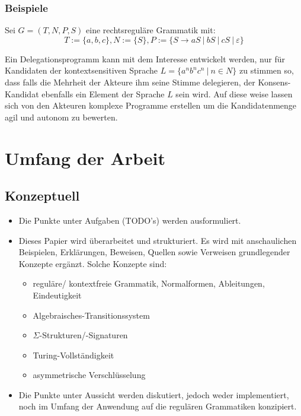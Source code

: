 \documentclass[]{article}
\begin{document}
\subsubsection*{Beispiele}

Sei $G=(T,N,P,S)$ eine rechtsreguläre Grammatik mit:
\[ T:=\{ a, b, c \}, N:=\{S\}, P:= \{S\rightarrow aS\ |\ bS\ |\ cS\ |\ \varepsilon \} \] 

Ein Delegationsprogramm kann mit dem Interesse entwickelt werden, nur für Kandidaten der kontextsensitiven Sprache $L = \{ a^nb^nc^n\ |\ n\in N\}$ zu stimmen so, dass falls die Mehrheit der Akteure ihm seine Stimme delegieren, der Konsens-Kandidat ebenfalls ein Element der Sprache $L$ sein wird. Auf diese weise lassen sich von den Akteuren komplexe Programme erstellen um die Kandidatenmenge agil und autonom zu bewerten.

\section{Umfang der Arbeit}

\subsection*{Konzeptuell}
\begin{itemize}
  \item Die Punkte unter Aufgaben (TODO's) werden ausformuliert.
  \item Dieses Papier wird überarbeitet und strukturiert. Es wird mit anschaulichen Beispielen, Erklärungen, Beweisen,  Quellen sowie Verweisen grundlegender Konzepte ergänzt. Solche Konzepte sind: 
    \begin{itemize}
      \item reguläre/ kontextfreie Grammatik, Normalformen, Ableitungen, Eindeutigkeit
      \item Algebraisches-Transitionssystem
      \item $\Sigma$-Strukturen/-Signaturen
      \item Turing-Vollständigkeit
      \item asymmetrische Verschlüsselung
    \end{itemize}
  \item Die Punkte unter Aussicht werden diskutiert, jedoch weder implementiert, noch im Umfang der Anwendung auf die regulären Grammatiken konzipiert.
\end{itemize}
\end{document}

